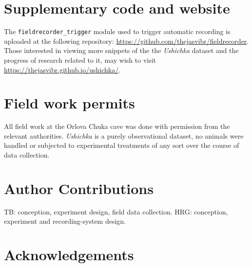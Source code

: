 \documentclass[
]{book}
\begin{document}
\hypertarget{supplementary-code-and-website}{%
\section{Supplementary code and website}\label{supplementary-code-and-website}}

The \texttt{fieldrecorder\_trigger} module used to trigger automatic recording is uploaded at the following repository: \url{https://github.com/thejasvibr/fieldrecorder}. Those interested in viewing more snippets of the the \emph{Ushichka} dataset and the progress of research related to it, may wish to visit \url{https://thejasvibr.github.io/ushichka/}.

\hypertarget{field-work-permits}{%
\section{Field work permits}\label{field-work-permits}}

All field work at the Orlova Chuka cave was done with permission from the relevant authorities. \emph{Ushichka} is a purely observational dataset, no animals were handled or subjected to experimental treatments of any sort over the course of data collection.

\hypertarget{author-contributions-1}{%
\section{Author Contributions}\label{author-contributions-1}}

TB: conception, experiment design, field data collection. HRG: conception, experiment and recording-system design.

\hypertarget{acknowledgements-3}{%
\section{Acknowledgements}\label{acknowledgements-3}}
\end{document}
